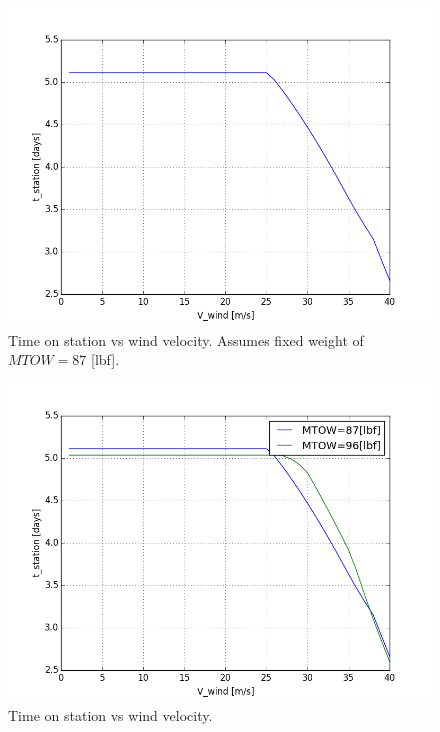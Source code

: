 \documentclass[10pt, a4paper]{article}
\begin{document}
\newpage

\begin{figure}[h!]
\begin{center}
\includegraphics[scale = .5]{tvsV_wind}
\caption{Time on station vs wind velocity.  Assumes fixed weight of $MTOW = 87$ [lbf].}
\end{center}
\end{figure}

\begin{figure}[h!]
\begin{center}
\includegraphics[scale = .5]{tvsV_wind96}
\caption{Time on station vs wind velocity. } 
\end{center}
\end{figure}
\end{document}
